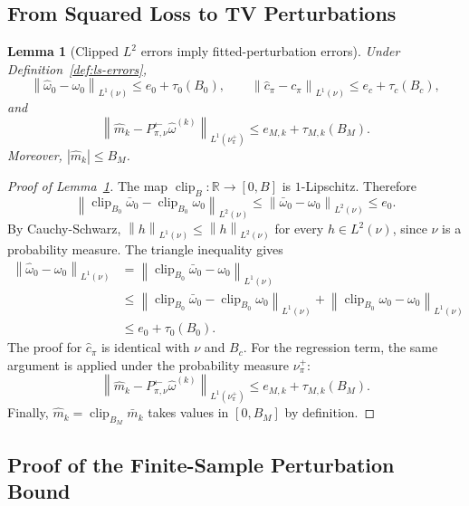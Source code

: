 \documentclass{article}
\newcommand{\mhat}{\widehat m}
\newcommand{\R}{\mathbb{R}}
\newcommand{\1}{\mathbf{1}}
\newcommand{\nup}{\nu_\pi^+}
\newcommand{\cpi}{c_\pi}
\newcommand{\omegazero}{\omega_0}
\newcommand{\omegahatzero}{\widehat{\omega}_0}
\newcommand{\Pback}{P_{\pi,\nu}^{\leftarrow}}
\newcommand{\Mpi}{\Pback}
\newcommand{\omegahat}{\widehat{\omega}}
\newcommand{\chat}{\widehat{c}_\pi}
\newcommand{\norm}[2][]{\left\lVert #2 \right\rVert_{#1}}
\newcommand{\LoneNu}[1]{\norm[L^1(\nu)]{#1}}
\newcommand{\LoneNuPlus}[1]{\norm[L^1(\nu_\pi^+)]{#1}}
\newcommand{\LtwoNu}[1]{\norm[L^2(\nu)]{#1}}
\newcommand{\abs}[1]{\left\lvert #1 \right\rvert}
\newcommand{\Clip}{\operatorname{clip}}
\theoremstyle{plain}
\newtheorem{lemma}[theorem]{Lemma}
\theoremstyle{definition}
\theoremstyle{remark}
\begin{document}
\subsection{From Squared Loss to TV Perturbations}

\begin{lemma}[Clipped $L^2$ errors imply fitted-perturbation errors]
\label{lem:l2-to-tv}
Under Definition~\ref{def:ls-errors},
\[
    \LoneNu{\omegahatzero-\omegazero}\le e_0+\tau_0(B_0),
    \qquad
    \LoneNu{\chat-\cpi}\le e_c+\tau_c(B_c),
\]
and
\[
    \LoneNuPlus{\mhat_k-\Mpi\omegahat^{(k)}}\le e_{M,k}+\tau_{M,k}(B_M).
\]
Moreover, $\abs{\mhat_k}\le B_M$.
\end{lemma}

\begin{proof}[Proof of Lemma~\ref{lem:l2-to-tv}]
The map $\Clip_B:\R\to[0,B]$ is $1$-Lipschitz.
Therefore
\[
    \LtwoNu{\Clip_{B_0}\bar\omega_0-\Clip_{B_0}\omegazero}
    \le
    \LtwoNu{\bar\omega_0-\omegazero}
    \le e_0.
\]
By Cauchy-Schwarz, $\LoneNu{h}\le \LtwoNu{h}$ for every $h\in L^2(\nu)$, since $\nu$ is a probability measure.
The triangle inequality gives
\[
\begin{aligned}
    \LoneNu{\omegahatzero-\omegazero}
    &=
    \LoneNu{\Clip_{B_0}\bar\omega_0-\omegazero}\\
    &\le
    \LoneNu{\Clip_{B_0}\bar\omega_0-\Clip_{B_0}\omegazero}
    +
    \LoneNu{\Clip_{B_0}\omegazero-\omegazero}\\
    &\le
    e_0+\tau_0(B_0).
\end{aligned}
\]
The proof for $\chat$ is identical with $\nu$ and $B_c$.
For the regression term, the same argument is applied under the probability measure $\nup$:
\[
    \LoneNuPlus{\mhat_k-\Mpi\omegahat^{(k)}}
    \le
    e_{M,k}+\tau_{M,k}(B_M).
\]
Finally, $\mhat_k=\Clip_{B_M}\bar m_k$ takes values in $[0,B_M]$ by definition.
\end{proof}

\subsection{Proof of the Finite-Sample Perturbation Bound}
\end{document}
